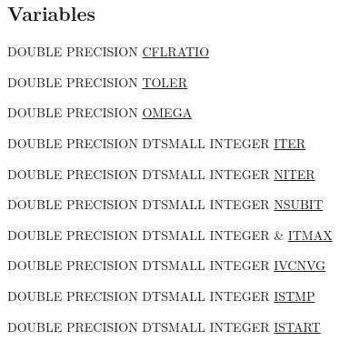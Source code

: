 \subsection*{Variables}
\begin{DoxyCompactItemize}
\item 
D\-O\-U\-B\-L\-E P\-R\-E\-C\-I\-S\-I\-O\-N \hyperlink{home_2abonfi_2_c_f_d__codes_2_eul_f_s_83_84_2include_2conv_8com_afddb47408d5e35303a408fd28821caa1}{C\-F\-L\-R\-A\-T\-I\-O}
\item 
D\-O\-U\-B\-L\-E P\-R\-E\-C\-I\-S\-I\-O\-N \hyperlink{home_2abonfi_2_c_f_d__codes_2_eul_f_s_83_84_2include_2conv_8com_a695d875d45bd834620ef52158325ca2a}{T\-O\-L\-E\-R}
\item 
D\-O\-U\-B\-L\-E P\-R\-E\-C\-I\-S\-I\-O\-N \hyperlink{home_2abonfi_2_c_f_d__codes_2_eul_f_s_83_84_2include_2conv_8com_a27b76f3b783d9cc5fffe85f1e22ecb89}{O\-M\-E\-G\-A}
\item 
D\-O\-U\-B\-L\-E P\-R\-E\-C\-I\-S\-I\-O\-N D\-T\-S\-M\-A\-L\-L I\-N\-T\-E\-G\-E\-R \hyperlink{home_2abonfi_2_c_f_d__codes_2_eul_f_s_83_84_2include_2conv_8com_a5e8268d7a99a27a3889882b8cb685176}{I\-T\-E\-R}
\item 
D\-O\-U\-B\-L\-E P\-R\-E\-C\-I\-S\-I\-O\-N D\-T\-S\-M\-A\-L\-L I\-N\-T\-E\-G\-E\-R \hyperlink{home_2abonfi_2_c_f_d__codes_2_eul_f_s_83_84_2include_2conv_8com_a0a434a625bddcbee262d330f471d5b54}{N\-I\-T\-E\-R}
\item 
D\-O\-U\-B\-L\-E P\-R\-E\-C\-I\-S\-I\-O\-N D\-T\-S\-M\-A\-L\-L I\-N\-T\-E\-G\-E\-R \hyperlink{home_2abonfi_2_c_f_d__codes_2_eul_f_s_83_84_2include_2conv_8com_aceeea16657a8729e23a6145062b0af71}{N\-S\-U\-B\-I\-T}
\item 
D\-O\-U\-B\-L\-E P\-R\-E\-C\-I\-S\-I\-O\-N D\-T\-S\-M\-A\-L\-L I\-N\-T\-E\-G\-E\-R \& \hyperlink{home_2abonfi_2_c_f_d__codes_2_eul_f_s_83_84_2include_2conv_8com_aed14565252ecc7b0d32f2e1eece0e781}{I\-T\-M\-A\-X}
\item 
D\-O\-U\-B\-L\-E P\-R\-E\-C\-I\-S\-I\-O\-N D\-T\-S\-M\-A\-L\-L I\-N\-T\-E\-G\-E\-R \hyperlink{home_2abonfi_2_c_f_d__codes_2_eul_f_s_83_84_2include_2conv_8com_acef83c369dada2c28e14e0bbf42054cf}{I\-V\-C\-N\-V\-G}
\item 
D\-O\-U\-B\-L\-E P\-R\-E\-C\-I\-S\-I\-O\-N D\-T\-S\-M\-A\-L\-L I\-N\-T\-E\-G\-E\-R \hyperlink{home_2abonfi_2_c_f_d__codes_2_eul_f_s_83_84_2include_2conv_8com_a6a9285d211dcd0595d66dcbd00736595}{I\-S\-T\-M\-P}
\item 
D\-O\-U\-B\-L\-E P\-R\-E\-C\-I\-S\-I\-O\-N D\-T\-S\-M\-A\-L\-L I\-N\-T\-E\-G\-E\-R \hyperlink{home_2abonfi_2_c_f_d__codes_2_eul_f_s_83_84_2include_2conv_8com_a860a2b695f2e90fdf11124cedcd72ef6}{I\-S\-T\-A\-R\-T}

\end{DoxyCompactItemize}
